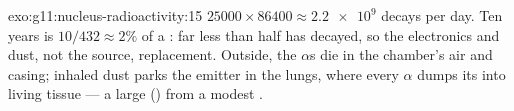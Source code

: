 \begin{solution}{exo:g11:nucleus-radioactivity:15}
$\num{25000} \times 86400 \approx \num{2.2e9}$ decays per day. Ten years is
$10/432 \approx 2\%$ of a : far less than half has decayed, so the
electronics and dust, not the source,  replacement. Outside, the
$\alpha$s die in the chamber's air and casing; inhaled dust parks the
emitter in the lungs, where every $\alpha$ dumps its  into living
tissue --- a large  () from a modest .
\end{solution}

